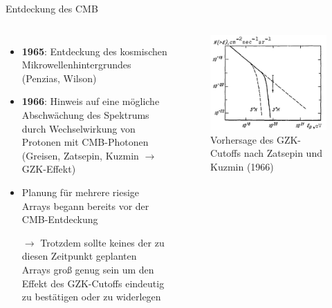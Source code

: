 \documentclass[aspectratio=1610, professionalfonts, 9pt, hyperref={colorlinks=false}]{beamer}
\begin{document}
\begin{frame}{Entdeckung des CMB}
  \begin{columns}
      \begin{itemize}
        \setlength\itemsep{0.5em}
        \item \textbf{1965}: Entdeckung des kosmischen Mikrowellenhintergrundes (Penzias, Wilson)
      	\item \textbf{1966}: Hinweis auf eine mögliche Abschwächung des Spektrums durch Wechselwirkung von Protonen mit CMB-Photonen (Greisen, Zatsepin, Kuzmin $\rightarrow$ GZK-Effekt)
      	\item Planung für mehrere riesige Arrays begann bereits vor der CMB-Entdeckung
      	\item[$\rightarrow$] Trotzdem sollte keines der zu diesen Zeitpunkt geplanten Arrays groß genug sein um den Effekt des GZK-Cutoffs eindeutig zu bestätigen oder zu widerlegen
      \end{itemize}
        \vspace*{10px}
  
      \begin{figure}
          \centering
          \includegraphics[width=\linewidth]{images/gzk}
          \caption{Vorhersage des GZK-Cutoffs nach Zatsepin und Kuzmin (1966) \cite{9789400754225}}
      \end{figure}
  \end{columns}
\end{frame}
\end{document}
